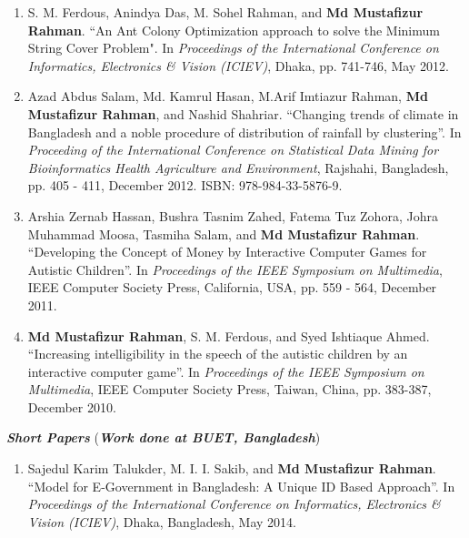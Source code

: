 \documentclass[11pt]{res}
\begin{document}
\begin{resume}
\begin{enumerate}
    \item S.  M.  Ferdous,  Anindya  Das,  M.  Sohel  Rahman, and  {\bf Md
    Mustafizur  Rahman}. ``An Ant Colony Optimization approach to solve the
    Minimum  String Cover Problem". In {\it Proceedings of the International Conference on Informatics, Electronics & Vision (ICIEV)}, Dhaka, pp. 741-746, May 2012. %
    
    \item  Azad Abdus Salam, Md. Kamrul Hasan, M.Arif Imtiazur Rahman, {\bf Md Mustafizur Rahman}, and Nashid Shahriar. ``Changing trends of climate in Bangladesh and a noble procedure of distribution of rainfall by clustering''. In {\it Proceeding of the International Conference on Statistical Data Mining for Bioinformatics Health Agriculture and Environment}, Rajshahi, Bangladesh, pp. 405 - 411, December 2012. ISBN: 978-984-33-5876-9.
    
    
    \item  Arshia Zernab Hassan, Bushra Tasnim Zahed, Fatema Tuz Zohora, Johra Muhammad Moosa, Tasmiha Salam, and {\bf Md Mustafizur Rahman}. ``Developing the Concept of Money by Interactive Computer Games for Autistic Children''. In {\it Proceedings of the IEEE Symposium on Multimedia}, IEEE Computer Society Press, California, USA, pp. 559 - 564, December 2011. %
    
    \item {\bf Md Mustafizur Rahman}, S. M. Ferdous, and Syed Ishtiaque Ahmed. ``Increasing intelligibility in the speech of the autistic children by an interactive computer game''. In {\it Proceedings of the IEEE Symposium on Multimedia}, IEEE Computer Society Press, Taiwan, China, pp. 383-387, December 2010. %
    
    
\end{enumerate}    


\textbf{\textit{Short Papers}} ({\sl \textbf{Work done at BUET, Bangladesh}})
\begin{enumerate} \itemsep -2pt    

    \item  Sajedul Karim Talukder, M. I. I. Sakib, and {\bf Md Mustafizur Rahman}. ``Model for E-Government in Bangladesh: A Unique ID Based Approach''. In {\it Proceedings of the International Conference on Informatics, Electronics & Vision (ICIEV)}, Dhaka, Bangladesh, May 2014. %
    

\end{enumerate}
\end{resume}
\end{document}
